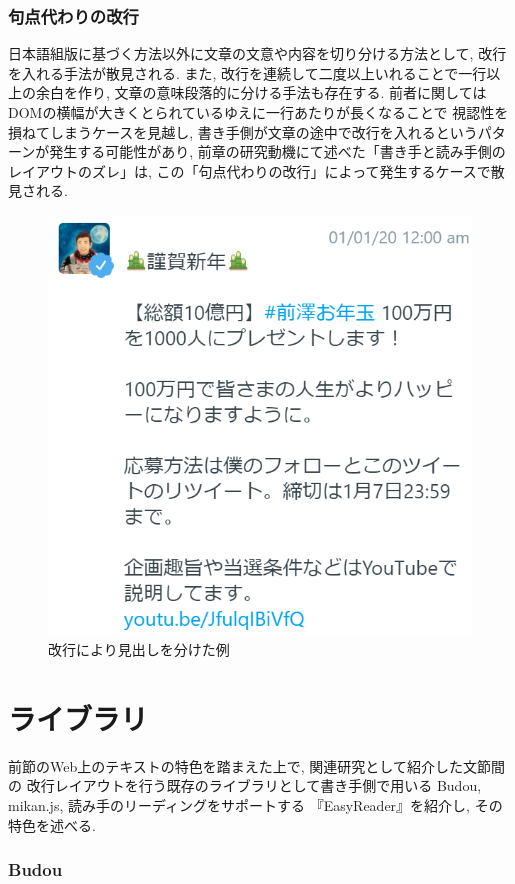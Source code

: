 \subsubsection{句点代わりの改行}
日本語組版に基づく方法以外に文章の文意や内容を切り分ける方法として, 改行を入れる手法が散見される.
また, 改行を連続して二度以上いれることで一行以上の余白を作り, 文章の意味段落的に分ける手法も存在する.
前者に関してはDOMの横幅が大きくとられているゆえに一行あたりが長くなることで
視認性を損ねてしまうケースを見越し, 書き手側が文章の途中で改行を入れるというパターンが発生する可能性があり, 
前章の研究動機にて述べた「書き手と読み手側のレイアウトのズレ」は, この「句点代わりの改行」によって発生するケースで散見される.

\begin{figure}[H]
    \centering
    \label{fig:midashi}
    \includegraphics[width=0.6\columnwidth]{image/02/img_4.png}
    \caption[改行により見出しを分けた例] {改行により見出しを分けた例\footnotemark[1]}
\end{figure}

\section{ライブラリ}
前節のWeb上のテキストの特色を踏まえた上で, 関連研究として紹介した文節間の
改行レイアウトを行う既存のライブラリとして書き手側で用いる
Budou\footnotemark[2], mikan.js\footnotemark[3], 読み手のリーディングをサポートする
『EasyReader』を紹介し, その特色を述べる.


\subsubsection{Budou}

